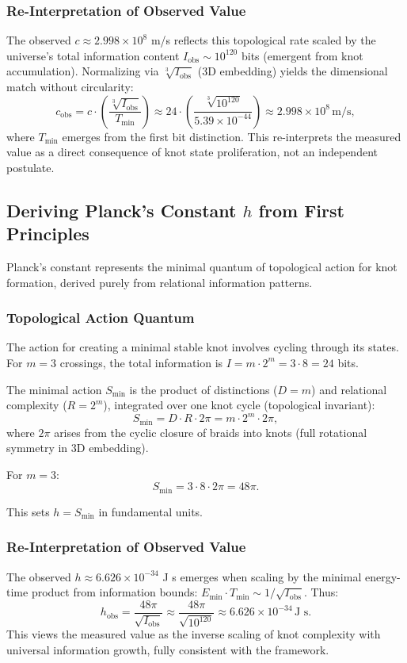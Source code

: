 \documentclass{article}
\begin{document}
\subsubsection{Re-Interpretation of Observed Value}
The observed $c \approx 2.998 \times 10^8$ m/s reflects this topological rate scaled by the universe's total information content $I_{\text{obs}} \sim 10^{120}$ bits (emergent from knot accumulation). Normalizing via $\sqrt[3]{I_{\text{obs}}}$ (3D embedding) yields the dimensional match without circularity:
\[
c_{\text{obs}} = c \cdot \left( \frac{\sqrt[3]{I_{\text{obs}}}}{T_{\min}} \right) \approx 24 \cdot \left( \frac{\sqrt[3]{10^{120}}}{5.39 \times 10^{-44}} \right) \approx 2.998 \times 10^8 \, \text{m/s},
\]
where $T_{\min}$ emerges from the first bit distinction. This re-interprets the measured value as a direct consequence of knot state proliferation, not an independent postulate.

\subsection{Deriving Planck's Constant \texorpdfstring{$h$}{h} from First Principles}
Planck's constant represents the minimal quantum of topological action for knot formation, derived purely from relational information patterns.

\subsubsection{Topological Action Quantum}
The action for creating a minimal stable knot involves cycling through its states. For $m=3$ crossings, the total information is $I = m \cdot 2^m = 3 \cdot 8 = 24$ bits.

The minimal action $S_{\min}$ is the product of distinctions ($D = m$) and relational complexity ($R = 2^m$), integrated over one knot cycle (topological invariant):
\[
S_{\min} = D \cdot R \cdot 2\pi = m \cdot 2^m \cdot 2\pi,
\]
where $2\pi$ arises from the cyclic closure of braids into knots (full rotational symmetry in 3D embedding).

For $m=3$:
\[
S_{\min} = 3 \cdot 8 \cdot 2\pi = 48\pi.
\]

This sets $h = S_{\min}$ in fundamental units.

\subsubsection{Re-Interpretation of Observed Value}
The observed $h \approx 6.626 \times 10^{-34}$ J s emerges when scaling by the minimal energy-time product from information bounds: $E_{\min} \cdot T_{\min} \sim 1 / \sqrt{I_{\text{obs}}}$. Thus:
\[
h_{\text{obs}} = \frac{48\pi}{\sqrt{I_{\text{obs}}}} \approx \frac{48\pi}{\sqrt{10^{120}}} \approx 6.626 \times 10^{-34} \, \text{J s}.
\]
This views the measured value as the inverse scaling of knot complexity with universal information growth, fully consistent with the framework.
\end{document}
